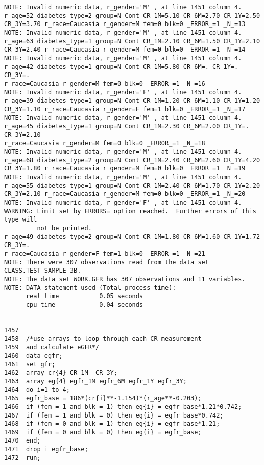 \documentclass{article}\usepackage[]{graphicx}\usepackage[]{color}
\begin{document}
\begin{verbatim}
NOTE: Invalid numeric data, r_gender='M' , at line 1451 column 4.
r_age=52 diabetes_type=2 group=N Cont CR_1M=5.10 CR_6M=2.70 CR_1Y=2.50
CR_3Y=3.70 r_race=Caucasia r_gender=M fem=0 blk=0 _ERROR_=1 _N_=13
NOTE: Invalid numeric data, r_gender='M' , at line 1451 column 4.
r_age=63 diabetes_type=1 group=N Cont CR_1M=2.10 CR_6M=1.50 CR_1Y=2.10
CR_3Y=2.40 r_race=Caucasia r_gender=M fem=0 blk=0 _ERROR_=1 _N_=14
NOTE: Invalid numeric data, r_gender='M' , at line 1451 column 4.
r_age=42 diabetes_type=1 group=N Cont CR_1M=5.80 CR_6M=. CR_1Y=. CR_3Y=.
r_race=Caucasia r_gender=M fem=0 blk=0 _ERROR_=1 _N_=16
NOTE: Invalid numeric data, r_gender='F' , at line 1451 column 4.
r_age=39 diabetes_type=1 group=N Cont CR_1M=1.20 CR_6M=1.10 CR_1Y=1.20
CR_3Y=1.10 r_race=Caucasia r_gender=F fem=1 blk=0 _ERROR_=1 _N_=17
NOTE: Invalid numeric data, r_gender='M' , at line 1451 column 4.
r_age=45 diabetes_type=1 group=N Cont CR_1M=2.30 CR_6M=2.00 CR_1Y=. CR_3Y=2.10
r_race=Caucasia r_gender=M fem=0 blk=0 _ERROR_=1 _N_=18
NOTE: Invalid numeric data, r_gender='M' , at line 1451 column 4.
r_age=68 diabetes_type=2 group=N Cont CR_1M=2.40 CR_6M=2.60 CR_1Y=4.20
CR_3Y=1.80 r_race=Caucasia r_gender=M fem=0 blk=0 _ERROR_=1 _N_=19
NOTE: Invalid numeric data, r_gender='M' , at line 1451 column 4.
r_age=55 diabetes_type=1 group=N Cont CR_1M=2.40 CR_6M=1.70 CR_1Y=2.20
CR_3Y=2.10 r_race=Caucasia r_gender=M fem=0 blk=0 _ERROR_=1 _N_=20
NOTE: Invalid numeric data, r_gender='F' , at line 1451 column 4.
WARNING: Limit set by ERRORS= option reached.  Further errors of this type will
         not be printed.
r_age=49 diabetes_type=2 group=N Cont CR_1M=1.80 CR_6M=1.60 CR_1Y=1.72 CR_3Y=.
r_race=Caucasia r_gender=F fem=1 blk=0 _ERROR_=1 _N_=21
NOTE: There were 307 observations read from the data set CLASS.TEST_SAMPLE_3B.
NOTE: The data set WORK.GFR has 307 observations and 11 variables.
NOTE: DATA statement used (Total process time):
      real time           0.05 seconds
      cpu time            0.04 seconds


1457
1458  /*use arrays to loop through each CR measurement
1459  and calculate eGFR*/
1460  data egfr;
1461  set gfr;
1462  array cr{4} CR_1M--CR_3Y;
1463  array eg{4} egfr_1M egfr_6M egfr_1Y egfr_3Y;
1464  do i=1 to 4;
1465  egfr_base = 186*(cr{i}**-1.154)*(r_age**-0.203);
1466  if (fem = 1 and blk = 1) then eg{i} = egfr_base*1.21*0.742;
1467  if (fem = 1 and blk = 0) then eg{i} = egfr_base*0.742;
1468  if (fem = 0 and blk = 1) then eg{i} = egfr_base*1.21;
1469  if (fem = 0 and blk = 0) then eg{i} = egfr_base;
1470  end;
1471  drop i egfr_base;
1472  run;


\end{verbatim}
\end{document}
